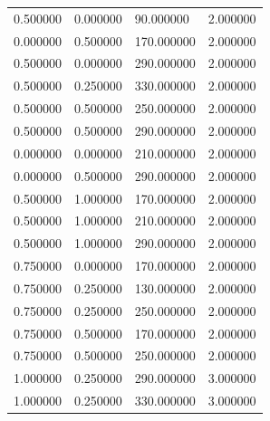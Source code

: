 \documentclass[12pt]{report}
\begin{document}
\begin{center}
\begin{table}[h!]
\begin{center}
\begin{tabular}{|llll|}
				0.500000                      & 0.000000                   & 90.000000                 & 2.000000 \\
				0.000000                      & 0.500000                   & 170.000000                & 2.000000 \\
				0.500000                      & 0.000000                   & 290.000000                & 2.000000 \\
				0.500000                      & 0.250000                   & 330.000000                & 2.000000 \\
				0.500000                      & 0.500000                   & 250.000000                & 2.000000 \\
				0.500000                      & 0.500000                   & 290.000000                & 2.000000 \\
				0.000000                      & 0.000000                   & 210.000000                & 2.000000 \\
				0.000000                      & 0.500000                   & 290.000000                & 2.000000 \\
				0.500000                      & 1.000000                   & 170.000000                & 2.000000 \\
				0.500000                      & 1.000000                   & 210.000000                & 2.000000 \\
				0.500000                      & 1.000000                   & 290.000000                & 2.000000 \\
				0.750000                      & 0.000000                   & 170.000000                & 2.000000 \\
				0.750000                      & 0.250000                   & 130.000000                & 2.000000 \\
				0.750000                      & 0.250000                   & 250.000000                & 2.000000 \\
				0.750000                      & 0.500000                   & 170.000000                & 2.000000 \\
				0.750000                      & 0.500000                   & 250.000000                & 2.000000 \\
				1.000000                      & 0.250000                   & 290.000000                & 3.000000 \\
				1.000000                      & 0.250000                   & 330.000000                & 3.000000 \\

\end{tabular}
\end{center}
\end{table}
\end{center}
\end{document}

